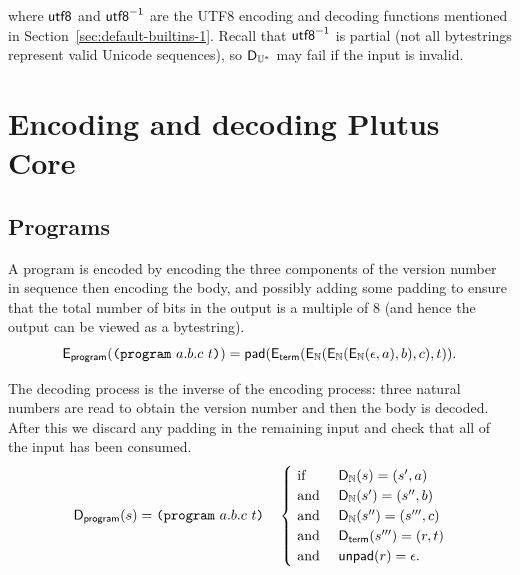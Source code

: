 \noindent
where $\mathsf{utf8}$ and $\mathsf{utf8}^{-1}$ are the UTF8 encoding and decoding functions
mentioned in Section~\ref{sec:default-builtins-1}. Recall that $\mathsf{utf8}^{-1}$
is partial (not all bytestrings represent valid Unicode sequences), so
$\mathsf{D}_{\mathbb{U}^*}$ may fail if the input is invalid.


\section{Encoding and decoding Plutus Core}

\subsection{Programs}
A program is encoded by encoding the three components of the version number in
sequence then encoding the body, and possibly adding some padding to ensure that
the total number of bits in the output is a multiple of 8 (and hence the output
can be viewed as a bytestring).
$$
\mathsf{E}_{\mathsf{program}}(\texttt{(program}\ a.b.c\ t\texttt{)}) =
\mathsf{pad}(\mathsf{E}_{\mathsf{term}}(\mathsf{E}_{\mathbb{N}}(\mathsf{E}_{\mathbb{N}}(\mathsf{E}_{\mathbb{N}}(\epsilon, a), b), c), t)).
$$

\noindent The decoding process is the inverse of the encoding process: three
natural numbers are read to obtain the version number and then the body is
decoded.  After this we discard any padding in the remaining input and check
that all of the input has been consumed.
$$
\mathsf{D}_{\mathsf{program}}(s) = \texttt{(program}\ a.b.c\ t\texttt{)} \quad
\begin{cases}
  \text{ if }  &\mathsf{D}_{\mathbb{N}}(s) = (s', a)\\
  \text{ and } &\mathsf{D}_{\mathbb{N}}(s') = (s'', b)\\
  \text{ and } &\mathsf{D}_{\mathbb{N}}(s'') = (s''', c)\\
  \text{ and } &\mathsf{D}_{\mathsf{term}}(s''') = (r, t)\\
  \text{ and } &\mathsf{unpad}(r) = \epsilon.
\end{cases}
$$

\noindent

